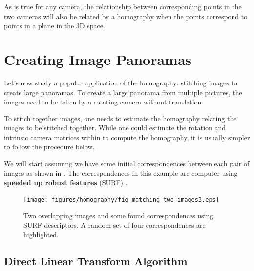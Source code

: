 As \eqn{\ref{eq:projectionintofirstcamera}} is true for any camera, the relationship between corresponding points in the two cameras will also be related by a homography when the points correspond to points in a plane in the 3D space. 


\section{Creating Image Panoramas}


Let's now study a popular application of the homography: stitching images to create large panoramas. To create a large panorama from multiple pictures, the images need to be taken by a rotating camera without translation.

To stitch together images, one needs to estimate the homography relating the images to be stitched together.  While one could estimate the rotation and intrinsic camera matrices within \eqn{\ref{eq:homo3}} to compute the homography, it is usually simpler to follow the procedure below.


We will start assuming we have some initial correspondences between each pair of images as shown in \fig{\ref{fig:fig_matching_two_images}}. The correspondences in this example are computer using {\bf speeded up robust features} (SURF) \cite{Bay2008346}. 


\begin{figure}[h!]
    \centerline{
        \texttt{[image: figures/homography/fig\_matching\_two\_images3.eps]}
    }
    \caption{Two overlapping images and some found correspondences using SURF descriptors. A random set of four correspondences are highlighted.}
    \label{fig:fig_matching_two_images}
\end{figure}

\subsection{Direct Linear Transform Algorithm}

